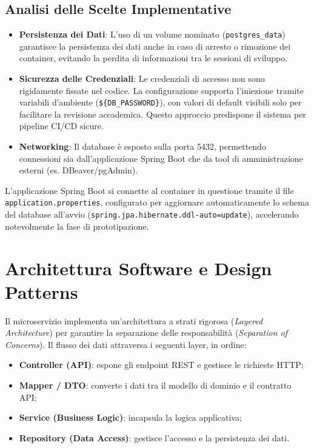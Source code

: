 \subsection{Analisi delle Scelte Implementative}
\begin{itemize}
    \item \textbf{Persistenza dei Dati}: L'uso di un volume nominato (\texttt{postgres\_data}) garantisce la persistenza dei dati anche in caso di arresto o rimozione dei container, evitando la perdita di informazioni tra le sessioni di sviluppo.
    \item \textbf{Sicurezza delle Credenziali}: Le credenziali di accesso non sono rigidamente fissate nel codice. La configurazione supporta l'iniezione tramite variabili d'ambiente (\texttt{\$\{DB\_PASSWORD\}}), con valori di default visibili solo per facilitare la revisione accademica. Questo approccio predispone il sistema per pipeline CI/CD sicure.
    \item \textbf{Networking}: Il database è esposto sulla porta 5432, permettendo connessioni sia dall'applicazione Spring Boot che da tool di amministrazione esterni (es. DBeaver/pgAdmin).
\end{itemize}

L'applicazione Spring Boot si connette al container in questione tramite il file \texttt{application.properties}, configurato per aggiornare automaticamente lo schema del database all'avvio (\texttt{spring.jpa.hibernate.ddl-auto=update}), accelerando notevolmente la fase di prototipazione.

\section{Architettura Software e Design Patterns}

Il microservizio implementa un'architettura a strati rigorosa (\textit{Layered Architecture}) per garantire la separazione delle responsabilità (\textit{Separation of Concerns}).
Il flusso dei dati attraversa i seguenti layer, in ordine:

\begin{itemize}
  \item \textbf{Controller (API)}: espone gli endpoint REST e gestisce le richieste HTTP;
  \item \textbf{Mapper / DTO}: converte i dati tra il modello di dominio e il contratto API;
  \item \textbf{Service (Business Logic)}: incapsula la logica applicativa;
  \item \textbf{Repository (Data Access)}: gestisce l’accesso e la persistenza dei dati.
\end{itemize}

